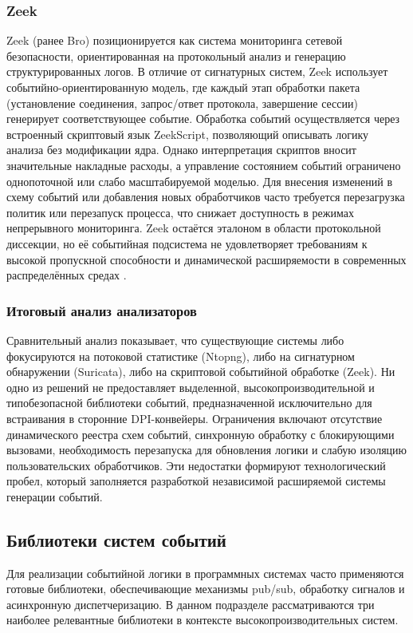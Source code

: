 \subsubsection{Zeek}
Zeek (ранее Bro) позиционируется как система мониторинга сетевой безопасности, ориентированная на протокольный анализ и генерацию структурированных логов. В отличие от сигнатурных систем, Zeek использует событийно-ориентированную модель, где каждый этап обработки пакета (установление соединения, запрос/ответ протокола, завершение сессии) генерирует соответствующее событие. Обработка событий осуществляется через встроенный скриптовый язык ZeekScript, позволяющий описывать логику анализа без модификации ядра. Однако интерпретация скриптов вносит значительные накладные расходы, а управление состоянием событий ограничено однопоточной или слабо масштабируемой моделью. Для внесения изменений в схему событий или добавления новых обработчиков часто требуется перезагрузка политик или перезапуск процесса, что снижает доступность в режимах непрерывного мониторинга. Zeek остаётся эталоном в области протокольной диссекции, но её событийная подсистема не удовлетворяет требованиям к высокой пропускной способности и динамической расширяемости в современных распределённых средах \cite{zeek2022design}.

\subsubsection{Итоговый анализ анализаторов}
Сравнительный анализ показывает, что существующие системы либо фокусируются на потоковой статистике (Ntopng), либо на сигнатурном обнаружении (Suricata), либо на скриптовой событийной обработке (Zeek). Ни одно из решений не предоставляет выделенной, высокопроизводительной и типобезопасной библиотеки событий, предназначенной исключительно для встраивания в сторонние DPI-конвейеры. Ограничения включают отсутствие динамического реестра схем событий, синхронную обработку с блокирующими вызовами, необходимость перезапуска для обновления логики и слабую изоляцию пользовательских обработчиков. Эти недостатки формируют технологический пробел, который заполняется разработкой независимой расширяемой системы генерации событий.

\subsection{Библиотеки систем событий}
Для реализации событийной логики в программных системах часто применяются готовые библиотеки, обеспечивающие механизмы pub/sub, обработку сигналов и асинхронную диспетчеризацию. В данном подразделе рассматриваются три наиболее релевантные библиотеки в контексте высокопроизводительных систем.

